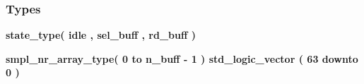 \subsubsection*{Types}
 \begin{DoxyCompactItemize}
\item 
{\bfseries {\bf state\+\_\+type}{\bfseries \textcolor{vhdlchar}{(}\textcolor{vhdlchar}{ }\textcolor{vhdlchar}{idle}\textcolor{vhdlchar}{ }\textcolor{vhdlchar}{,}\textcolor{vhdlchar}{ }\textcolor{vhdlchar}{sel\+\_\+buff}\textcolor{vhdlchar}{ }\textcolor{vhdlchar}{,}\textcolor{vhdlchar}{ }\textcolor{vhdlchar}{rd\+\_\+buff}\textcolor{vhdlchar}{ }\textcolor{vhdlchar}{)}\textcolor{vhdlchar}{ }}} 
\item 
{\bfseries {\bf smpl\+\_\+nr\+\_\+array\+\_\+type}{\bfseries \textcolor{vhdlchar}{(}\textcolor{vhdlchar}{ }\textcolor{vhdlchar}{ } \textcolor{vhdldigit}{0} \textcolor{vhdlchar}{ }\textcolor{keywordflow}{to}\textcolor{vhdlchar}{ }\textcolor{vhdlchar}{ }\textcolor{vhdlchar}{ }\textcolor{vhdlchar}{ }{\bfseries {\bf n\+\_\+buff}} \textcolor{vhdlchar}{-\/}\textcolor{vhdlchar}{ } \textcolor{vhdldigit}{1} \textcolor{vhdlchar}{ }\textcolor{vhdlchar}{)}\textcolor{vhdlchar}{ }\textcolor{vhdlchar}{ }\textcolor{comment}{std\+\_\+logic\+\_\+vector}\textcolor{vhdlchar}{ }\textcolor{vhdlchar}{(}\textcolor{vhdlchar}{ }\textcolor{vhdlchar}{ } \textcolor{vhdldigit}{63} \textcolor{vhdlchar}{ }\textcolor{keywordflow}{downto}\textcolor{vhdlchar}{ }\textcolor{vhdlchar}{ } \textcolor{vhdldigit}{0} \textcolor{vhdlchar}{ }\textcolor{vhdlchar}{)}\textcolor{vhdlchar}{ }}} 
\end{DoxyCompactItemize}
